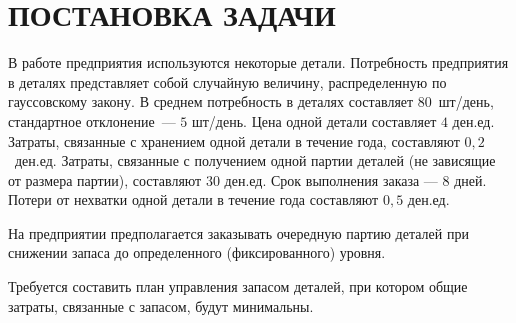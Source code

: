 \section{ПОСТАНОВКА ЗАДАЧИ}

В работе предприятия используются некоторые детали.
Потребность предприятия в деталях представляет собой случайную величину,
распределенную по гауссовскому закону. В среднем потребность в
деталях составляет $80$ шт/день, стандартное отклонение --- $5$ шт/день.
Цена одной детали составляет $4$ ден.ед.
Затраты, связанные с хранением одной детали в течение года,
составляют $0{,}2$ ден.ед. Затраты, связанные с получением
одной партии деталей (не зависящие от размера партии),
составляют $30$ ден.ед. Срок выполнения заказа --- $8$ дней.
Потери от нехватки одной детали в течение года составляют $0{,}5$ ден.ед.

На предприятии предполагается заказывать очередную партию деталей
при снижении запаса до определенного (фиксированного) уровня.

Требуется составить план управления запасом деталей,
при котором общие затраты, связанные с запасом, будут минимальны.